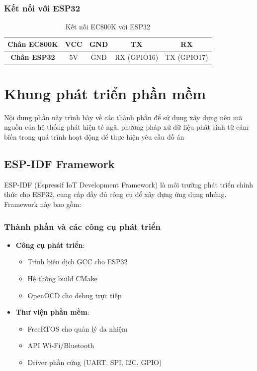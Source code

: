 \documentclass[a4paper,12pt]{report}
\begin{document}
	\subsubsection{Kết nối với ESP32}
	\begin{table}[h]
		\centering
		\caption{Kết nối EC800K với ESP32}
		\label{tab:ec800k_connection}
		\begin{tabular}{|c|c|c|c|c|}
			\hline
			\textbf{Chân EC800K} & VCC & GND & TX & RX \\ \hline
			\textbf{Chân ESP32} & 5V & GND & RX (GPIO16) & TX (GPIO17) \\ \hline
		\end{tabular}
	\end{table}
	
	\section{Khung phát triển phần mềm}
	Nội dung phần này trình bày về các thành phần để sử dụng xây dựng nên mã nguồn của hệ thống phát hiện té ngã, phương pháp xử dữ liệu phát sinh từ cảm biến trong quá trình hoạt động để thực hiện yêu cầu đồ án
	\subsection{ESP-IDF Framework}
	ESP-IDF (Espressif IoT Development Framework) là môi trường phát triển chính thức cho ESP32, cung cấp đầy đủ công cụ để xây dựng ứng dụng nhúng. Framework này bao gồm:
	
	\subsubsection{Thành phần và các công cụ phát triển}
	\begin{itemize}
		\item \textbf{Công cụ phát triển}:
		\begin{itemize}
			\item Trình biên dịch GCC cho ESP32
			\item Hệ thống build CMake
			\item OpenOCD cho debug trực tiếp
		\end{itemize}
		
		\item \textbf{Thư viện phần mềm}:
		\begin{itemize}
			\item FreeRTOS cho quản lý đa nhiệm
			\item API Wi-Fi/Bluetooth
			\item Driver phần cứng (UART, SPI, I2C, GPIO)
		\end{itemize}
	\end{itemize}
	
\end{document}
